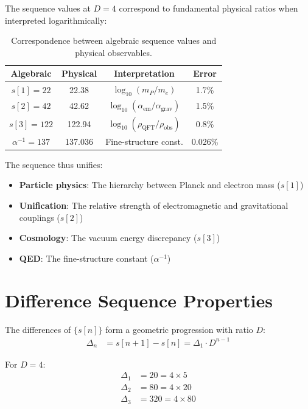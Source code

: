 \documentclass[twocolumn,showpacs,preprintnumbers,amsmath,amssymb,prl]{revtex4-2}
\begin{document}
The sequence values at $D = 4$ correspond to fundamental physical ratios when interpreted logarithmically:

\begin{table}[h]
\centering
\begin{tabular}{cccc}
\hline
Algebraic & Physical & Interpretation & Error \\
\hline
$s[1] = 22$ & 22.38 & $\log_{10}(m_P/m_e)$ & 1.7\% \\
$s[2] = 42$ & 42.62 & $\log_{10}(\alpha_{\text{em}}/\alpha_{\text{grav}})$ & 1.5\% \\
$s[3] = 122$ & 122.94 & $\log_{10}(\rho_{\text{QFT}}/\rho_{\text{obs}})$ & 0.8\% \\
$\alpha^{-1} = 137$ & 137.036 & Fine-structure const. & 0.026\% \\
\hline
\end{tabular}
\caption{Correspondence between algebraic sequence values and physical observables.}
\label{tab:scales}
\end{table}

The sequence thus unifies:
\begin{itemize}
\item \textbf{Particle physics}: The hierarchy between Planck and electron mass ($s[1]$)
\item \textbf{Unification}: The relative strength of electromagnetic and gravitational couplings ($s[2]$)
\item \textbf{Cosmology}: The vacuum energy discrepancy ($s[3]$)
\item \textbf{QED}: The fine-structure constant ($\alpha^{-1}$)
\end{itemize}

\section{Difference Sequence Properties}

The differences of $\{s[n]\}$ form a geometric progression with ratio $D$:
\begin{align}
\Delta_n &= s[n+1] - s[n] = \Delta_1 \cdot D^{n-1}
\end{align}

For $D = 4$:
\begin{align}
\Delta_1 &= 20 = 4 \times 5 \\
\Delta_2 &= 80 = 4 \times 20 \\
\Delta_3 &= 320 = 4 \times 80
\end{align}
\end{document}
